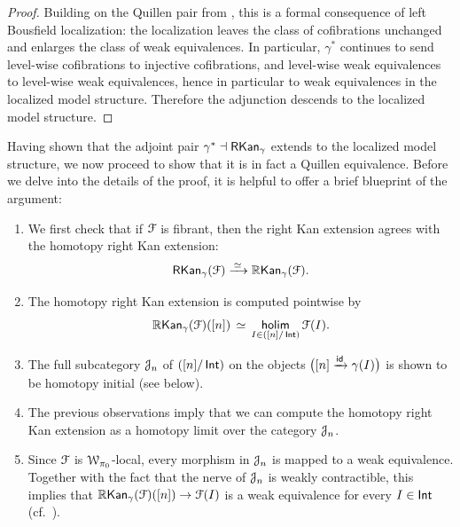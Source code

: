 \begin{proof}
    Building on the Quillen pair from , this is a formal consequence of left Bousfield localization: the localization leaves the class of cofibrations unchanged and enlarges the class of weak equivalences. In particular, $\gamma^*$ continues to send level-wise cofibrations to injective cofibrations, and level-wise weak equivalences to level-wise weak equivalences, hence in particular to weak equivalences in the localized model structure. Therefore the adjunction descends to the localized model structure.
\end{proof}

Having shown that the adjoint pair $\gamma^{*} \dashv \operatorname{{\sf RKan}}_{\gamma}$ extends to the localized model structure, we now proceed to show that it is in fact a Quillen equivalence. Before we delve into the details of the proof, it is helpful to offer a brief blueprint of the argument:
\begin{enumerate}
    \item[\textbf{\color{brown}{Step \ding{192}}}] We first check that if $\mathcal F$ is fibrant, then the right Kan extension agrees with the homotopy right Kan extension:
    \begin{equation}
        \operatorname{{\sf RKan}}_{\gamma}(\mathcal F) \xrightarrow{\,\simeq\,} \operatorname{\mathbb{R}\mathsf{Kan}}_{\gamma}(\mathcal F).
    \end{equation}
    \item[\textbf{\color{brown}{Step \ding{193}}}] The homotopy right Kan extension is computed pointwise by 
    \begin{equation}
        \operatorname{\mathbb{R}\mathsf{Kan}}_{\gamma}(\mathcal F)([n]) \,\simeq\, \underset{I \in ([n]/ \operatorname{\mathsf{Int}})}{\mathsf{holim}} \, \mathcal F(I).
    \end{equation}
    \item[\textbf{\color{brown}{Step \ding{194}}}] The full subcategory $\mathcal J_n$ of $([n]/ \operatorname{\mathsf{Int}})$ on the objects $\big([n] \xrightarrow{\operatorname{\sf id}} \gamma(I)\big)$ is shown to be homotopy initial (see  below).
    \item[\textbf{\color{brown}{Step \ding{195}}}] The previous observations imply that we can compute the homotopy right Kan extension as a homotopy limit over the category $\mathcal J_n$.
    \item[\textbf{\color{brown}{Step \ding{196}}}] Since $\mathcal F$ is $\mathcal W_{\pi_0}$-local, every morphism in $\mathcal J_n$ is mapped to a weak equivalence. Together with the fact that the nerve of $\mathcal J_n$ is weakly contractible, this implies that $\operatorname{\mathbb{R}\mathsf{Kan}}_{\gamma}(\mathcal F)([n]) \to \mathcal F(I)$ is a weak equivalence for every $I\in \operatorname{\mathsf{Int}}$ (cf.\ ).
\end{enumerate}

